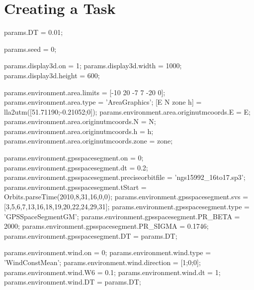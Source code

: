 \documentclass[a4paper,11pt]{report}
\begin{document}
\section{Creating a Task}  \label{sec:createtask}



params.DT = 0.01;

params.seed = 0; %

params.display3d.on = 1;
params.display3d.width = 1000;
params.display3d.height = 600;


params.environment.area.limits = [-10 20 -7 7 -20 0];
params.environment.area.type = 'AreaGraphics';
[E N zone h] = lla2utm([51.71190;-0.21052;0]);
params.environment.area.originutmcoords.E = E;
params.environment.area.originutmcoords.N = N;
params.environment.area.originutmcoords.h = h;  
params.environment.area.originutmcoords.zone =  zone;


params.environment.gpsspacesegment.on = 0; %
params.environment.gpsspacesegment.dt = 0.2;
params.environment.gpsspacesegment.preciseorbitfile = 'ngs15992_16to17.sp3';
params.environment.gpsspacesegment.tStart = Orbits.parseTime(2010,8,31,16,0,0);
params.environment.gpsspacesegment.svs = [3,5,6,7,13,16,18,19,20,22,24,29,31];
params.environment.gpsspacesegment.type = 'GPSSpaceSegmentGM';
params.environment.gpsspacesegment.PR_BETA = 2000;             %
params.environment.gpsspacesegment.PR_SIGMA = 0.1746;          %
params.environment.gpsspacesegment.DT = params.DT;

params.environment.wind.on = 0;
params.environment.wind.type = 'WindConstMean';
params.environment.wind.direction = [1;0;0]; %
params.environment.wind.W6 = 0.1;  %
params.environment.wind.dt = 1;    %
params.environment.wind.DT = params.DT;
\end{document}
